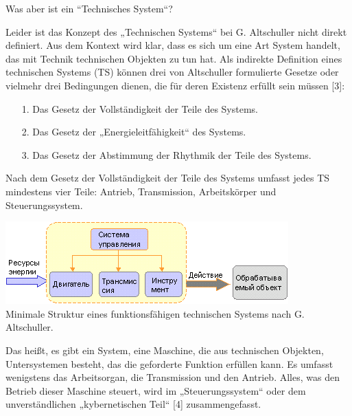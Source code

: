 \documentclass[11pt,a4paper]{article}
\begin{document}
Was aber ist ein “Technisches System“? 

Leider ist das Konzept des „Technischen Systems“ bei G. Altschuller nicht
direkt definiert. Aus dem Kontext wird klar, dass es sich um eine Art System
handelt, das mit Technik technischen Objekten zu tun hat. Als indirekte
Definition eines technischen Systems (TS) können drei von Altschuller
formulierte Gesetze oder vielmehr drei Bedingungen dienen, die für deren
Existenz erfüllt sein müssen [3]:
\begin{itemize}\itemsep0pt
\item[1.] Das Gesetz der Vollständigkeit der Teile des Systems. 
\item[2.] Das Gesetz der „Energieleitfähigkeit“ des Systems. 
\item[3.] Das Gesetz der Abstimmung der Rhythmik der Teile des Systems.
\end{itemize}
Nach dem Gesetz der Vollständigkeit der Teile des Systems umfasst jedes TS
mindestens vier Teile: Antrieb, Transmission, Arbeitskörper und
Steuerungssystem.
\begin{center}
 \includegraphics[width=.6\textwidth]{mts-1.png}\\ Minimale Struktur eines
 funktionsfähigen technischen Systems nach G. Altschuller.
\end{center}
Das heißt, es gibt ein System, eine Maschine, die aus technischen Objekten,
Untersystemen besteht, das die geforderte Funktion erfüllen kann. Es umfasst
wenigstens das Arbeitsorgan, die Transmission und den Antrieb. Alles, was den
Betrieb dieser Maschine steuert, wird im „Steuerungssystem“ oder dem
unverständlichen „kybernetischen Teil“ [4] zusammengefasst.
\end{document}
